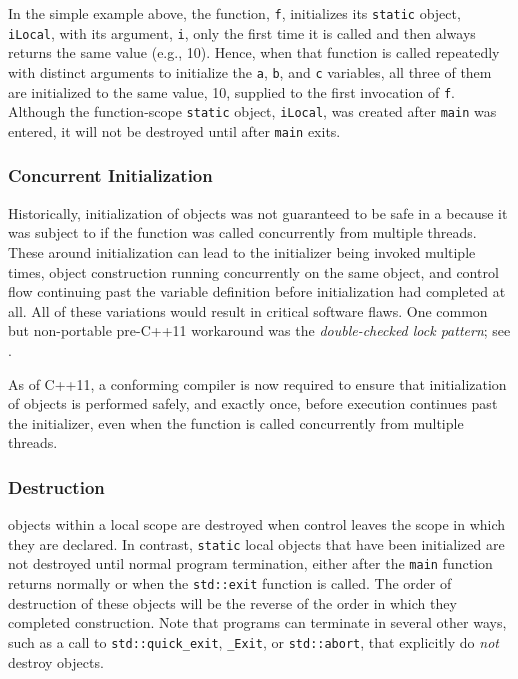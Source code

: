 \noindent In the simple example above, the function, \lstinline!f!, initializes its
\lstinline!static! object, \lstinline!iLocal!, with its argument, \lstinline!i!, only
the first time it is called and then always returns the same value
(e.g., 10). Hence, when that function is called repeatedly with distinct
arguments to initialize the \lstinline!a!, \lstinline!b!, and
\lstinline!c! variables, all three of them are initialized to the same
value, 10, supplied to the first invocation of \lstinline!f!. Although the function-scope \lstinline!static!
object, \lstinline!iLocal!, was created after \lstinline!main! was entered, it
will not be destroyed until after \lstinline!main! exits.

\subsubsection[Concurrent Initialization]{Concurrent Initialization}\label{concurrent-initialization}

Historically, initialization of 
 objects was not guaranteed to be safe in a
 because it was subject to    
if the function was called concurrently from multiple threads.   These 
around initialization can lead to the initializer being invoked multiple times, object
construction running concurrently on the same object, and control flow continuing past
the variable definition before initialization had completed at all.  All of these
variations would result in critical software flaws.
One common but non-portable pre-C++11 workaround was the 
\emph{double-checked lock pattern}; see .

As of C++11, a conforming compiler is now required to ensure that
initialization of  
objects is performed safely, and exactly once, before execution continues past the initializer, even when the function is called
concurrently from multiple threads. 

\subsubsection[Destruction]{Destruction}\label{destruction}

 objects within a local scope are destroyed when control
leaves the scope in which they are declared.
In contrast, \lstinline!static! local objects that have been initialized are
not destroyed until normal program termination,  either after the \lstinline!main! function returns
normally or when the \lstinline!std::exit! function is
called. 
The order of destruction
of these objects will be the reverse of the order in which they completed construction.
Note that programs can terminate in several other ways,
such as a call to \lstinline!std::quick_exit!, \lstinline!_Exit!, or
\lstinline!std::abort!, that explicitly do \emph{not} destroy
   objects.


